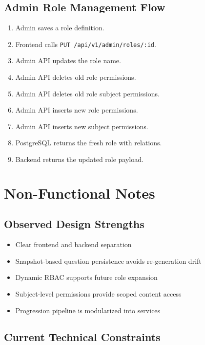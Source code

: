 \documentclass[11pt,a4paper]{article}
\newcommand{\docpath}[1]{\texttt{#1}}
\begin{document}
\subsection{Admin Role Management Flow}

\begin{enumerate}[leftmargin=1.5em]
  \item Admin saves a role definition.
  \item Frontend calls \docpath{PUT /api/v1/admin/roles/:id}.
  \item Admin API updates the role name.
  \item Admin API deletes old role permissions.
  \item Admin API deletes old role subject permissions.
  \item Admin API inserts new role permissions.
  \item Admin API inserts new subject permissions.
  \item PostgreSQL returns the fresh role with relations.
  \item Backend returns the updated role payload.
\end{enumerate}

\section{Non-Functional Notes}

\subsection{Observed Design Strengths}

\begin{itemize}[leftmargin=1.5em]
  \item Clear frontend and backend separation
  \item Snapshot-based question persistence avoids re-generation drift
  \item Dynamic RBAC supports future role expansion
  \item Subject-level permissions provide scoped content access
  \item Progression pipeline is modularized into services
\end{itemize}

\subsection{Current Technical Constraints}
\end{document}
